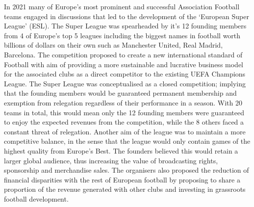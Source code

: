 \documentclass[
]{article}
\begin{document}
In 2021 many of Europe's most prominent and successful Association
Football teams engaged in discussions that led to the development of the
`European Super League' (ESL). The Super League was spearheaded by it's
12 founding members from 4 of Europe's top 5 leagues including the
biggest names in football worth billions of dollars on their own such as
Manchester United, Real Madrid, Barcelona. The competition proposed to
create a new international standard of Football with aim of providing a
more sustainable and lucrative business model for the associated clubs
as a direct competitor to the existing UEFA Champions League. The Super
League was conceptualised as a closed competition; implying that the
founding members would be guaranteed permanent membership and exemption
from relegation regardless of their performance in a season. With 20
teams in total, this would mean only the 12 founding members were
guaranteed to enjoy the expected revenues from the competition, while
the 8 others faced a constant threat of relegation. Another aim of the
league was to maintain a more competitive balance, in the sense that the
league would only contain games of the highest quality from Europe's
Best. The founders believed this would retain a larger global audience,
thus increasing the value of broadcasting rights, sponsorship and
merchandise sales. The organisers also proposed the reduction of
financial disparities with the rest of European football by proposing to
share a proportion of the revenue generated with other clubs and
investing in grassroots football development.
\end{document}
